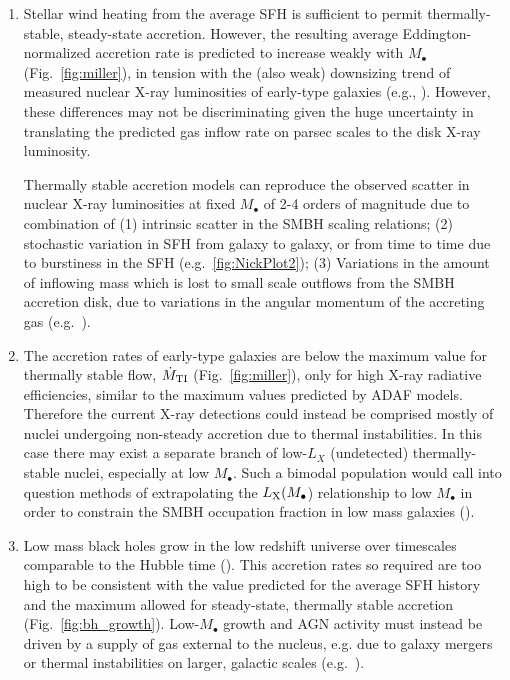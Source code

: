 \documentclass[usenatbib,fleqn]{mn2e}
\newcommand{\Mdot}{\dot{M}}
\newcommand{\rs}{r_s}
\newcommand{\rb}{r_b}
\newcommand{\Mbh}[1][]{M_{\bullet#1}}
\begin{document}
\begin{enumerate}
\item Stellar wind heating from the average SFH is sufficient to
  permit thermally-stable, steady-state accretion.  However, the
  resulting average Eddington-normalized accretion rate is predicted
  to increase weakly with $M_{\bullet}$ (Fig.~\ref{fig:miller}), in
  tension with the (also weak) downsizing trend of measured nuclear
  X-ray luminosities of early-type galaxies (e.g.,
  \citealt{Miller+15}).  However, these differences may not be
  discriminating given the huge uncertainty in translating the
  predicted gas inflow rate on parsec scales to the disk X-ray
  luminosity.

  Thermally stable accretion models can reproduce the observed scatter
  in nuclear X-ray luminosities at fixed $\Mbh$ of 2-4 orders of
  magnitude due to combination of (1) intrinsic scatter in the SMBH
  scaling relations; (2) stochastic variation in SFH from galaxy to
  galaxy, or from time to time due to burstiness in the SFH
  (e.g.~\ref{fig:NickPlot2}); (3) Variations in the amount of
  inflowing mass which is lost to small scale outflows from the SMBH
  accretion disk, due to variations in the angular momentum of the
  accreting gas (e.g.~\citealt{Li+13}).

\item  The accretion rates of early-type galaxies are below the maximum value for thermally stable flow, $\dot{M}_{\rm TI}$ (Fig.~\ref{fig:miller}), only for high X-ray radiative efficiencies, similar to the maximum values predicted by ADAF models.  Therefore the current X-ray detections could instead be comprised mostly of nuclei undergoing non-steady accretion due to thermal instabilities.  In this case there may exist a separate branch of low-$L_X$ (undetected) thermally-stable nuclei, especially at low $M_{\bullet}$.  Such a bimodal population would call into question methods of extrapolating the $L_{\rm X}(M_{\bullet}$) relationship to low $M_{\bullet}$ in order to constrain the SMBH occupation fraction in low mass galaxies (\citealt{Miller+15}).

\item Low mass black holes grow in the low redshift universe over
  timescales comparable to the Hubble time (\citet{Heckman+04}).  This
  accretion rates so required are too high to be consistent with the
  value predicted for the average SFH history and the maximum allowed
  for steady-state, thermally stable accretion
  (Fig.~\ref{fig:bh_growth}).  Low-$M_{\bullet}$ growth and AGN
  activity must instead be driven by a supply of gas external to the
  nucleus, e.g. due to galaxy mergers or thermal instabilities on
  larger, galactic scales (e.g.~\citealt{Voit+15}).

    

\end{enumerate}
   
\end{document}

